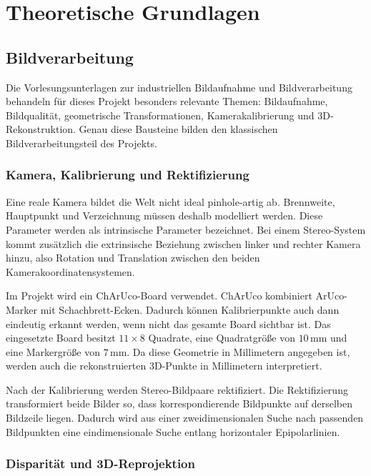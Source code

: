 \chapter{Theoretische Grundlagen}

\section{Bildverarbeitung}

Die Vorlesungsunterlagen zur industriellen Bildaufnahme und Bildverarbeitung behandeln für
dieses Projekt besonders relevante Themen: Bildaufnahme, Bildqualität,
geometrische Transformationen, Kamerakalibrierung und 3D-Rekonstruktion. Genau diese
Bausteine bilden den klassischen Bildverarbeitungsteil des Projekts.

\subsection{Kamera, Kalibrierung und Rektifizierung}

Eine reale Kamera bildet die Welt nicht ideal pinhole-artig ab. Brennweite, Hauptpunkt und
Verzeichnung müssen deshalb modelliert werden. Diese Parameter werden als intrinsische
Parameter bezeichnet. Bei einem Stereo-System kommt zusätzlich die extrinsische Beziehung
zwischen linker und rechter Kamera hinzu, also Rotation und Translation zwischen den beiden
Kamerakoordinatensystemen.

Im Projekt wird ein ChArUco-Board verwendet. ChArUco kombiniert ArUco-Marker mit
Schachbrett-Ecken. Dadurch können Kalibrierpunkte auch dann eindeutig erkannt werden, wenn
nicht das gesamte Board sichtbar ist. Das eingesetzte Board besitzt $11 \times 8$ Quadrate,
eine Quadratgröße von $10\,\mathrm{mm}$ und eine Markergröße von $7\,\mathrm{mm}$. Da diese
Geometrie in Millimetern angegeben ist, werden auch die rekonstruierten 3D-Punkte in
Millimetern interpretiert.

Nach der Kalibrierung werden Stereo-Bildpaare rektifiziert. Die Rektifizierung transformiert
beide Bilder so, dass korrespondierende Bildpunkte auf derselben Bildzeile liegen. Dadurch
wird aus einer zweidimensionalen Suche nach passenden Bildpunkten eine eindimensionale Suche
entlang horizontaler Epipolarlinien.

\subsection{Disparität und 3D-Reprojektion}

